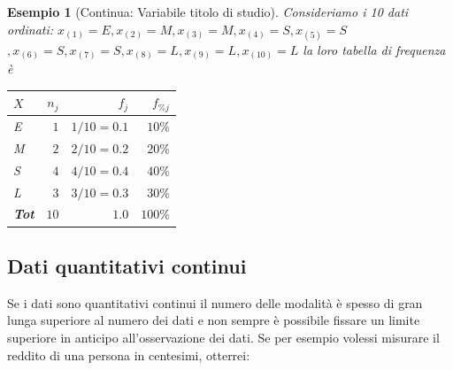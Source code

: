 \documentclass[
  11pt,
]{book}
\theoremstyle{mytheoremstyle}
\theoremstyle{mydefstyle}
\newtheorem{example}{{Esempio}}[section]
\begin{document}
\begin{example}[Continua: Variabile titolo di studio]

Consideriamo i 10 dati ordinati:
\(x_{(1)}=E,x_{(2)}=M,x_{(3)}=M,x_{(4)}=S,x_{(5)}=S\)
\(,x_{(6)}=S,x_{(7)}=S,x_{(8)}=L,x_{(9)}=L,x_{(10)}=L\)
la loro tabella di frequenza è

\begin{table}[!h]
\centering
\begin{tabular}{lrrr}
\toprule
$X$ & $n_j$ & $f_j$ & $f_{\% j}$\\
\midrule
E & $1$ & $1/10=0.1$ & $10\%$\\
M & $2$ & $2/10=0.2$ & $20\%$\\
S & $4$ & $4/10=0.4$ & $40\%$\\
L & $3$ & $3/10=0.3$ & $30\%$\\
\midrule
\textbf{Tot} & \textbf{$10$} & \textbf{$1.0$} & \textbf{$100\%$}\\
\midrule
\bottomrule
\end{tabular}
\end{table}

\end{example}

\subsection{Dati quantitativi continui}\label{dati-quantitativi-continui}

Se i dati sono quantitativi continui il numero delle modalità è spesso di
gran lunga superiore al numero dei dati e non sempre è possibile fissare un limite superiore
in anticipo all'osservazione dei dati. Se per esempio volessi misurare il
reddito di una persona in centesimi, otterrei:
\end{document}
